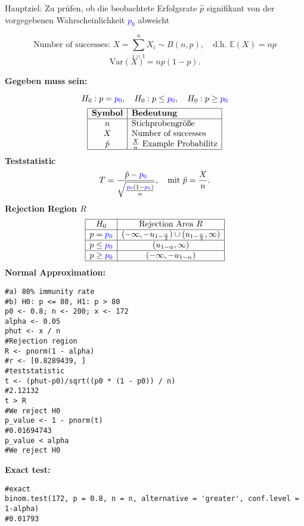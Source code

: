 Hauptziel: Zu prüfen, ob die beobachtete Erfolgsrate $\hat{p}$ signifikant von der vorgegebenen Wahrscheinlichkeit \textcolor{blue}{$p_0$} abweicht
\begin{center}
$$
\text{Number of successes: } X = \sum_{i=1}^n X_i \sim B(n, p), \quad \text{d.h. } \mathbb{E}(X) = np
$$$$
\text{Var}(X) = np(1-p).
$$
\end{center}
\large{\textbf{Gegeben muss sein:}}

\[
H_0: p = \textcolor{blue}{\textcolor{blue}{p_0}}, \quad H_0: p \leq \textcolor{blue}{p_0}, \quad H_0: p \geq \textcolor{blue}{p_0}
\]
\[
\begin{array}{|c|l|}
\hline
\textbf{Symbol} & \textbf{Bedeutung} \\
\hline
n& \text{Stichprobengröße} \\
X & \text{Number of successes} \\
\hat{p}& \frac{X}{n} \text{ Example Probabilitz} \\
\hline
\end{array}
\]
\large{\textbf{Teststatistic}}
$$
T = \frac{\hat{p} - \textcolor{blue}{p_0}}{\sqrt{\frac{\textcolor{blue}{p_0}(1-\textcolor{blue}{p_0})}{n}}}, \quad \text{mit } \hat{p} = \frac{X}{n}.
$$
\large{\textbf{Rejection Region $R$}}
\[
\begin{array}{|c|c|}
\hline
H_0 & \text{Rejection Area } R \\ \hline
p = \textcolor{blue}{p_0} & (-\infty, -u_{1-\frac{\alpha}{2}}) \cup (u_{1-\frac{\alpha}{2}}, \infty) \\ \hline
p \leq \textcolor{blue}{p_0} & (u_{1-\alpha}, \infty) \\ \hline
p \geq \textcolor{blue}{p_0} & (-\infty, -u_{1-\alpha}) \\ \hline
\end{array}
\]
\large{\textbf{Normal Approximation:}}
\begin{lstlisting}
#a) 80% immunity rate
#b) H0: p <= 80, H1: p > 80
p0 <- 0.8; n <- 200; x <- 172
alpha <- 0.05
phut <- x / n
#Rejection region
R <- pnorm(1 - alpha)
#r <- [0.8289439, ]
#teststatistic
t <- (phut-p0)/sqrt((p0 * (1 - p0)) / n)
#2.12132
t > R
#We reject H0
p_value <- 1 - pnorm(t)
#0.01694743
p_value < alpha
#We reject H0
\end{lstlisting}
\large{\textbf{Exact test:}}
\begin{lstlisting}
#exact
binom.test(172, p = 0.8, n = n, alternative = 'greater', conf.level = 1-alpha)
#0.01793
\end{lstlisting}
